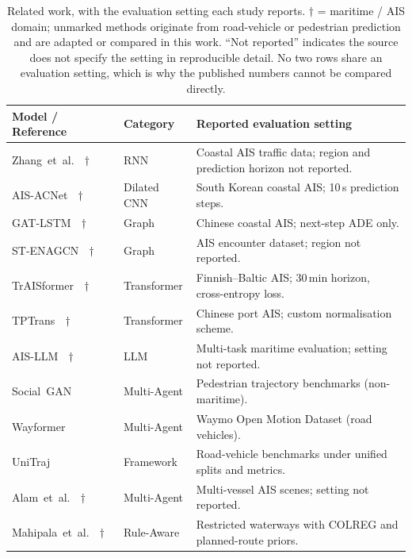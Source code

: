\documentclass[12pt, a4paper]{article}
\begin{document}
  \begin{table}[H]
    \centering
    \small
    \caption{Related work, with the evaluation setting each study reports.
             $\dagger$ = maritime / AIS domain; unmarked methods originate from
             road-vehicle or pedestrian prediction and are adapted or compared
             in this work.  ``Not reported'' indicates the source does not
             specify the setting in reproducible detail.  No two rows share an
             evaluation setting, which is why the published numbers cannot be
             compared directly.}
    \label{tab:related_work}
    \begin{tabular}{p{3.6cm} p{2.3cm} p{8.5cm}}
      \toprule
      \textbf{Model / Reference} & \textbf{Category} & \textbf{Reported evaluation setting} \\
      \midrule
      Zhang~et~al.~\citeyear{zhang2024lstmgru}$\,\dagger$
        & RNN
        & Coastal AIS traffic data; region and prediction horizon not reported. \\[4pt]
      AIS-ACNet~\citep{shin2024aisacnet}$\,\dagger$
        & Dilated CNN
        & South Korean coastal AIS; 10\,s prediction steps. \\[4pt]
      GAT-LSTM~\citep{zhao2023gatlstm}$\,\dagger$
        & Graph
        & Chinese coastal AIS; next-step ADE only. \\[4pt]
      ST-ENAGCN~\citep{zeng2024stenagcn}$\,\dagger$
        & Graph
        & AIS encounter dataset; region not reported. \\[4pt]
      TrAISformer~\citep{nguyen2021traisformer}$\,\dagger$
        & Transformer
        & Finnish--Baltic AIS; 30\,min horizon, cross-entropy loss. \\[4pt]
      TPTrans~\citep{wang2024tptrans}$\,\dagger$
        & Transformer
        & Chinese port AIS; custom normalisation scheme. \\[4pt]
      AIS-LLM~\citep{park2025aisllm}$\,\dagger$
        & LLM
        & Multi-task maritime evaluation; setting not reported. \\[4pt]
      Social~GAN~\citep{gupta2018socialgan}
        & Multi-Agent
        & Pedestrian trajectory benchmarks (non-maritime). \\[4pt]
      Wayformer~\citep{nayakanti2022wayformer}
        & Multi-Agent
        & Waymo Open Motion Dataset (road vehicles). \\[4pt]
      UniTraj~\citep{feng2024unitraj}
        & Framework
        & Road-vehicle benchmarks under unified splits and metrics. \\[4pt]
      Alam~et~al.~\citeyear{alam2025multivessel}$\,\dagger$
        & Multi-Agent
        & Multi-vessel AIS scenes; setting not reported. \\[4pt]
      Mahipala~et~al.~\citeyear{mahipala2025colreg}$\,\dagger$
        & Rule-Aware
        & Restricted waterways with COLREG and planned-route priors. \\
      \bottomrule
    \end{tabular}
  \end{table}
\end{document}
